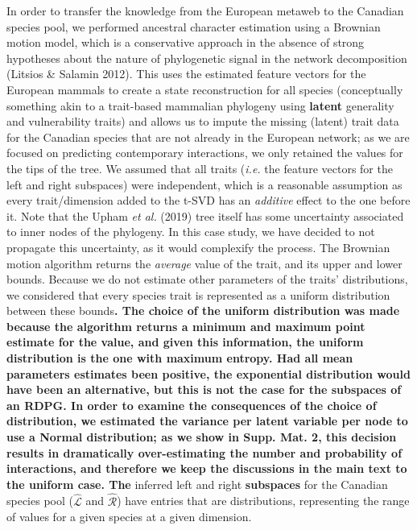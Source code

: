 \documentclass[11pt]{article}
\makeatletter
\def\maxwidth{\ifdim\Gin@nat@width>\linewidth\linewidth
\else\Gin@nat@width\fi}
\let\Oldincludegraphics\includegraphics
\renewcommand{\includegraphics}[1]{\Oldincludegraphics[width=\maxwidth]{#1}}
\providecommand{\DIFaddtex}[1]{{\bf #1}} %
\providecommand{\DIFdeltex}[1]{} %
\providecommand{\DIFaddbegin}{\protect\color{blue}} %
\providecommand{\DIFaddend}{\protect\color{black}} %
\providecommand{\DIFdelbegin}{\protect\color{red}} %
\providecommand{\DIFdelend}{\protect\color{black}} %
\providecommand{\DIFadd}[1]{\texorpdfstring{\DIFaddtex{#1}}{#1}} %
\providecommand{\DIFdel}[1]{\texorpdfstring{\DIFdeltex{#1}}{}} %
\newcommand{\DIFscaledelfig}{0.5}
\newlength{\DIFdelgraphicswidth} %
\newlength{\DIFdelgraphicsheight} %
\newcommand{\DIFaddincludegraphics}[2][]{{\color{blue}\fbox{\DIFOincludegraphics[#1]{#2}}}} %
\newcommand{\DIFdelincludegraphics}[2][]{%
\sbox{\DIFdelgraphicsbox}{\DIFOincludegraphics[#1]{#2}}%
\settoboxwidth{\DIFdelgraphicswidth}{\DIFdelgraphicsbox} %
\settoboxtotalheight{\DIFdelgraphicsheight}{\DIFdelgraphicsbox} %
\scalebox{\DIFscaledelfig}{%
\parbox[b]{\DIFdelgraphicswidth}{\usebox{\DIFdelgraphicsbox}\\[-\baselineskip] \rule{\DIFdelgraphicswidth}{0em}}\llap{\resizebox{\DIFdelgraphicswidth}{\DIFdelgraphicsheight}{%
\setlength{\unitlength}{\DIFdelgraphicswidth}%
\begin{picture}(1,1)%
\thicklines\linethickness{2pt} %
{\color[rgb]{1,0,0}\put(0,0){\framebox(1,1){}}}%
{\color[rgb]{1,0,0}\put(0,0){\line( 1,1){1}}}%
{\color[rgb]{1,0,0}\put(0,1){\line(1,-1){1}}}%
\end{picture}%
}\hspace*{3pt}}} %
} %
\DeclareRobustCommand{\DIFaddbegin}{\DIFOaddbegin \let\includegraphics\DIFaddincludegraphics} %
\DeclareRobustCommand{\DIFaddend}{\DIFOaddend \let\includegraphics\DIFOincludegraphics} %
\DeclareRobustCommand{\DIFdelbegin}{\DIFOdelbegin \let\includegraphics\DIFdelincludegraphics} %
\DeclareRobustCommand{\DIFdelend}{\DIFOaddend \let\includegraphics\DIFOincludegraphics} %
\makeatother
\begin{document}
In order to transfer the knowledge from the European metaweb to the
Canadian species pool, we performed ancestral character estimation using
a Brownian motion model, which is a conservative approach in the absence
of strong hypotheses about the nature of phylogenetic signal in the
network decomposition (Litsios \& Salamin 2012). This uses the estimated
feature vectors for the European mammals to create a state
reconstruction for all species (conceptually something akin to a
trait-based mammalian phylogeny using \DIFaddbegin \DIFadd{latent }\DIFaddend generality and
vulnerability traits) and allows us to impute the missing (latent) trait
data for the Canadian species that are not already in the European
network; as we are focused on predicting contemporary interactions, we
only retained the values for the tips of the tree. We assumed that all
traits (\emph{i.e.} the feature vectors for the left and right
subspaces) were independent, which is a reasonable assumption as every
trait/dimension added to the t-SVD has an \emph{additive} effect to the
one before it. Note that the Upham \emph{et al.} (2019) tree itself has
some uncertainty associated to inner nodes of the phylogeny. In this
case study, we have decided to not propagate this uncertainty, as it
would complexify the process. The Brownian motion algorithm returns the
\emph{average} value of the trait, and its upper and lower bounds.
Because we do not estimate other parameters of the traits'
distributions, we considered that every species trait is represented as
a uniform distribution between these bounds\DIFdelbegin \DIFdel{; in a situation where the algorithm would return point values for all simulations, one could in theory either estimate the parameters of a
distribution for each tip, or draw randomly from the outputs. In all
cases, the }\DIFdelend \DIFaddbegin \DIFadd{. The choice of the uniform
distribution was made because the algorithm returns a minimum and
maximum point estimate for the value, and given this information, the
uniform distribution is the one with maximum entropy. Had all mean
parameters estimates been positive, the exponential distribution would
have been an alternative, but this is not the case for the subspaces of
an RDPG. In order to examine the consequences of the choice of
distribution, we estimated the variance per latent variable per node to
use a Normal distribution; as we show in Supp. Mat. 2, this decision
results in dramatically over-estimating the number and probability of
interactions, and therefore we keep the discussions in the main text to
the uniform case. The }\DIFaddend inferred left and right \DIFdelbegin \DIFdel{sub-spaces }\DIFdelend \DIFaddbegin \DIFadd{subspaces }\DIFaddend for the Canadian
species pool (\(\hat{\mathscr{L}}\) and \(\hat{\mathscr{R}}\)) have
entries that are distributions, representing the range of values for a
given species at a given dimension.
\end{document}

